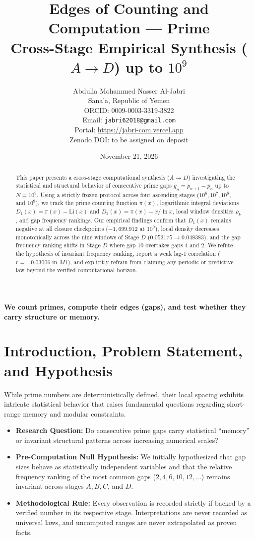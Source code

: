 \documentclass[12pt,a4paper]{article}
\title{\textbf{Edges of Counting and Computation — Prime}\\
\large Cross-Stage Empirical Synthesis ($A \rightarrow D$) up to $10^9$}
\author{Abdulla Mohammed Nasser Al-Jabri \\
Sana'a, Republic of Yemen \\
ORCID: 0009-0003-3319-3822 \\
Email: \texttt{jabri62018@gmail.com} \\
Portal: \url{https://jabri-com.vercel.app} \\
Zenodo DOI: to be assigned on deposit}
\date{November 21, 2026}
\begin{document}
\maketitle
\thispagestyle{firstpage}

\begin{center}
\textbf{We count primes, compute their edges (gaps), and test whether they carry structure or memory.}
\end{center}

\begin{abstract}
This paper presents a cross-stage computational synthesis ($A \rightarrow D$) investigating the statistical and structural behavior of consecutive prime gaps $g_n = p_{n+1} - p_n$ up to $N = 10^9$. Using a strictly frozen protocol across four ascending stages ($10^6, 10^7, 10^8$, and $10^9$), we track the prime counting function $\pi(x)$, logarithmic integral deviations $D_1(x) = \pi(x) - \mathrm{Li}(x)$ and $D_2(x) = \pi(x) - x/\ln x$, local window densities $\rho_k$, and gap frequency rankings. Our empirical findings confirm that $D_1(x)$ remains negative at all closure checkpoints ($-1,699.912$ at $10^9$), local density decreases monotonically across the nine windows of Stage $D$ ($0.053175 \rightarrow 0.048383$), and the gap frequency ranking shifts in Stage $D$ where gap $10$ overtakes gaps $4$ and $2$. We refute the hypothesis of invariant frequency ranking, report a weak lag-1 correlation ($r = -0.03006$ in $M1$), and explicitly refrain from claiming any periodic or predictive law beyond the verified computational horizon.
\end{abstract}

\section{Introduction, Problem Statement, and Hypothesis}
While prime numbers are deterministically defined, their local spacing exhibits intricate statistical behavior that raises fundamental questions regarding short-range memory and modular constraints.

\begin{itemize}
    \item \textbf{Research Question:} Do consecutive prime gaps carry statistical ``memory'' or invariant structural patterns across increasing numerical scales?
    \item \textbf{Pre-Computation Null Hypothesis:} We initially hypothesized that gap sizes behave as statistically independent variables and that the relative frequency ranking of the most common gaps ($2, 4, 6, 10, 12, \dots$) remains invariant across stages $A, B, C$, and $D$.
    \item \textbf{Methodological Rule:} Every observation is recorded strictly if backed by a verified number in its respective stage. Interpretations are never recorded as universal laws, and uncomputed ranges are never extrapolated as proven facts.
\end{itemize}
\end{document}
